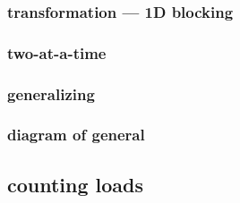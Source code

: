 \subsubsection{transformation --- 1D blocking}






\subsubsection{two-at-a-time}

%

\subsubsection{generalizing}


\subsubsection{diagram of general}


%

\subsection{counting loads}
%


